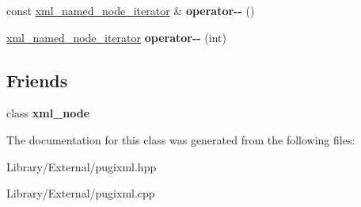 \begin{DoxyCompactItemize}
\item 
\hypertarget{classpugi_1_1xml__named__node__iterator_aaee9df71be9b3a08f871cbf420d8384d}{}const \hyperlink{classpugi_1_1xml__named__node__iterator}{xml\+\_\+named\+\_\+node\+\_\+iterator} \& {\bfseries operator-\/-\/} ()\label{classpugi_1_1xml__named__node__iterator_aaee9df71be9b3a08f871cbf420d8384d}

\item 
\hypertarget{classpugi_1_1xml__named__node__iterator_af5b1c61a813276537774d60e32c6408c}{}\hyperlink{classpugi_1_1xml__named__node__iterator}{xml\+\_\+named\+\_\+node\+\_\+iterator} {\bfseries operator-\/-\/} (int)\label{classpugi_1_1xml__named__node__iterator_af5b1c61a813276537774d60e32c6408c}

\end{DoxyCompactItemize}
\subsection*{Friends}
\begin{DoxyCompactItemize}
\item 
\hypertarget{classpugi_1_1xml__named__node__iterator_a156d917a92815c7b593bd5ef19f6d5fb}{}class {\bfseries xml\+\_\+node}\label{classpugi_1_1xml__named__node__iterator_a156d917a92815c7b593bd5ef19f6d5fb}

\end{DoxyCompactItemize}


The documentation for this class was generated from the following files\+:\begin{DoxyCompactItemize}
\item 
Library/\+External/pugixml.\+hpp\item 
Library/\+External/pugixml.\+cpp\end{DoxyCompactItemize}
